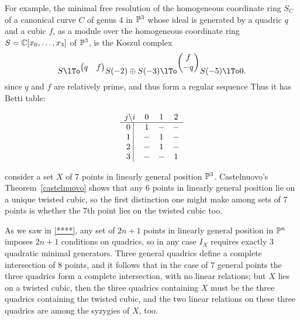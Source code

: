 \begin{example}\label{canonical in P3}
For example, the minimal free resolution of the homogeneous coordinate ring $S_{C}$ of a canonical curve $C$ of genus 4 in $\PP^{3}$ whose ideal is generated by a quadric $q$ and a cubic $f$, as a module over the homogeneous coordinate ring $S = \CC[x_{0},\dots,x_{3}]$ of $\PP^{3}$, is the Koszul complex
\small
$$
S \lTo^{
\begin{pmatrix}
  q& f
\end{pmatrix}}
S(-2) \oplus S(-3) \lTo^{
\begin{pmatrix}
f\\-q 
\end{pmatrix}
}
S(-5)\lTo 0.
$$
\normalsize
since
$q$ and $f$ are relatively prime, and thus form a regular sequence
Thus it has  Betti table:

\setcounter{MaxMatrixCols}{13}
\begin{small}
$$
\begin{matrix}
j \backslash i     &0&1&2\\ \hline
\text{0 }\vline &1&-&-\\
\text{1 }\vline &-&1&-\\
\text{2 }\vline &-&1&-\\
\text{3 }\vline &-&-&1\\
\end{matrix}
$$
\end{small}
\end{example}

\begin{example}
  consider a set $X$ of 7 points in linearly general position $\PP^3$. 
Castelnuovo's Theorem~\ref{castelnuovo} shows that any 6 points in linearly general position lie on a unique twisted cubic, so the first distinction one might make among sets of 7 points is whether the 7th point lies on the twisted cubic too.

As we saw in \ref{****}, any set of $2n+1$ points in linearly general position in $\PP^{n}$ imposes $2n+1$ conditions on quadrics, so in any case $I_{X}$ requires exactly 3 quadratic minimal generators. Three general quadrics define a complete intersection of 8 points, and it follows that in the case of 7 general points the three quadrics form a complete intersection, with no linear relations; but $X$ lies on a twisted cubic, then the three quadrics containing $X$ must be the three quadrics containing the twisted cubic, and the two linear relations on these three quadrics are among the syzygies of $X$, too.
\end{example}

